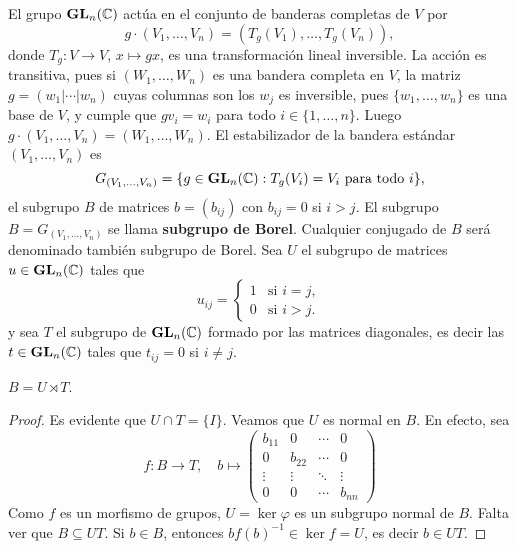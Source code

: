 El grupo $\mathbf{GL}_n(\mathbb{C})$ actúa en el conjunto de banderas completas de $V$ por 
\[
g\cdot (V_1,\dots,V_n)=(T_g(V_1),\dots,T_g(V_n)),
\]
donde $T_g\colon V\to V$, $x\mapsto gx$, es una transformación lineal inversible. La acción es transitiva, pues
si $(W_1,\dots,W_n)$ es una bandera completa en $V$, la matriz
$g=(w_1|\cdots|w_n)$ cuyas columnas son los $w_j$ es inversible, pues $\{w_1,\dots,w_n\}$ es una base de $V$, 
y cumple que
$gv_i=w_i$ para todo $i\in\{1,\dots,n\}$. Luego $g\cdot (V_1,\dots,V_n)=(W_1,\dots,W_n)$. 
El estabilizador de la bandera estándar $(V_1,\dots,V_n)$ es
\[
G_{(V_1,\dots,V_n)}=\{g\in\mathbf{GL}_n(\mathbb{C}):T_g(V_i)=V_i\text{ para todo $i$}\},
\]
el subgrupo $B$ de matrices $b=(b_{ij})$ con $b_{ij}=0$ si $i>j$. 
El subgrupo $B=G_{(V_1,\dots,V_n)}$ se llama \textbf{subgrupo de Borel}.
Cualquier conjugado de $B$ será denominado también subgrupo de Borel. 
Sea $U$ 
el subgrupo de matrices $u\in\mathbf{GL}_n(\mathbb{C})$ tales que 
\[
u_{ij}=\begin{cases}
1 & \text{si $i=j$},\\
0 & \text{si $i>j$}.	
\end{cases}
\]
y sea $T$ el subgrupo de $\mathbf{GL}_n(\mathbb{C})$ formado por las matrices diagonales, es decir
las $t\in\mathbf{GL}_n(\mathbb{C})$ tales que $t_{ij}=0$ si $i\ne j$. 

\begin{proposition}
$B=U\rtimes T$.	
\end{proposition}

\begin{proof}
Es evidente que $U\cap T=\{I\}$. Veamos que $U$ es normal en $B$. En efecto, sea 
\[
f\colon B\to T,\quad b\mapsto\begin{pmatrix}
b_{11} & 0 & \cdots & 0\\
0 & b_{22} & \cdots & 0\\
\vdots & \vdots & \ddots & \vdots\\
0 & 0 & \cdots & b_{nn}	
\end{pmatrix}
\]
Como $f$ es un morfismo de grupos, $U=\ker\varphi$ es un subgrupo normal de $B$. Falta ver que 
$B\subseteq UT$. Si $b\in B$, entonces
$bf(b)^{-1}\in\ker f=U$, es decir 
$b\in UT$. 
\end{proof}

